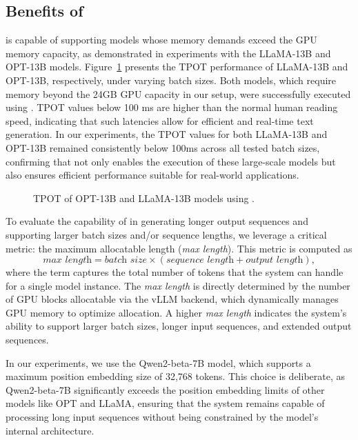 \subsection{Benefits of \sys}
\label{sec:benefits}

\sys is capable of supporting models whose memory demands exceed the GPU memory capacity, as demonstrated in experiments with the LLaMA-13B and OPT-13B models. 
Figure~\ref{fig:eval3} presents the TPOT performance of LLaMA-13B and OPT-13B, respectively, under varying batch sizes. Both models, 
which require memory beyond the 24GB GPU capacity in our setup, were successfully executed using \sys. 
TPOT values below 100 ms are higher than the normal human reading speed, indicating that such latencies allow for efficient and real-time text generation. 
In our experiments, the TPOT values for both LLaMA-13B and OPT-13B remained consistently below 100ms across all tested batch sizes, 
confirming that \sys not only enables the execution of these large-scale models but also ensures efficient performance suitable for real-world applications.

\begin{figure}[t]
    \centering
    \resizebox{\columnwidth}{!}{
 }
    \caption{TPOT of OPT-13B and LLaMA-13B models using \sys.}
    \label{fig:eval3}
\end{figure}

To evaluate the capability of \sys in generating longer output sequences and supporting larger batch sizes and/or sequence lengths, we leverage a critical metric:
the maximum allocatable length (\textit{max length}). 
This metric is computed as 
\[
\textit{max length} = \textit{batch size} \times (\textit{sequence length} + \textit{output length}),
\]
where the term captures the total number of tokens that the system can handle for a single model instance. 
The \textit{max length} is directly determined by the number of GPU blocks allocatable via the vLLM backend, which dynamically manages GPU memory to optimize allocation. 
A higher \textit{max length} indicates the system’s ability to support larger batch sizes, longer input sequences, and extended output sequences.

In our experiments, we use the Qwen2-beta-7B model, which supports a maximum position embedding size of 32,768 tokens. 
This choice is deliberate, as Qwen2-beta-7B significantly exceeds the position embedding limits of other models like OPT and LLaMA, 
ensuring that the system remains capable of processing long input sequences without being constrained by the model's internal architecture. 

